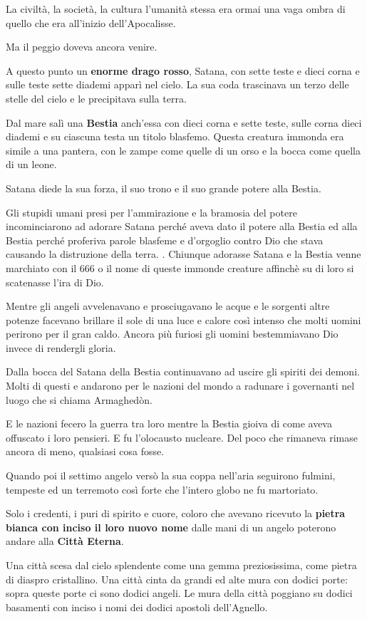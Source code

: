 \documentclass[12pt,a4paper,twoside,openany]{book}
\begin{document}
\begin{multicols}{2}
La civiltà, la società, la cultura l'umanità stessa era ormai una vaga ombra di quello che era all'inizio dell'Apocalisse.

Ma il peggio doveva ancora venire.

A questo punto un \textbf{enorme drago rosso}, Satana, con sette teste e dieci corna e sulle teste sette diademi apparì nel cielo. La sua coda trascinava un terzo delle stelle del cielo e le precipitava sulla terra. 

Dal mare salì una \textbf{Bestia} anch'essa con dieci corna e sette teste, sulle corna dieci diademi e su ciascuna testa un titolo blasfemo. Questa creatura immonda era simile a una pantera, con le zampe come quelle di un orso e la bocca come quella di un leone. 

Satana diede la sua forza, il suo trono e il suo grande potere alla Bestia. 

Gli stupidi umani presi per l'ammirazione e la bramosia del potere incominciarono ad adorare Satana perché aveva dato il potere alla Bestia ed alla Bestia perché proferiva parole blasfeme e d'orgoglio contro Dio che stava causando la distruzione della terra.
.
Chiunque adorasse Satana e la Bestia venne marchiato con il 666 o il nome di queste immonde creature affinchè su di loro si scatenasse l'ira di Dio.

Mentre gli angeli avvelenavano e prosciugavano le acque e le sorgenti altre potenze facevano brillare il sole di una luce e calore così intenso che molti uomini perirono per il gran caldo. Ancora più furiosi gli uomini bestemmiavano Dio invece di rendergli gloria.

Dalla bocca del Satana della Bestia continuavano ad uscire gli spiriti dei demoni. Molti di questi e andarono per le nazioni del mondo a radunare i governanti nel luogo che si chiama Armaghedòn.

E le nazioni fecero la guerra tra loro mentre la Bestia gioiva di come aveva offuscato i loro pensieri. E fu l'olocausto nucleare. Del poco che rimaneva rimase ancora di meno, qualsiasi cosa fosse.

Quando poi il settimo angelo versò la sua coppa nell’aria seguirono fulmini, tempeste ed un terremoto così forte che l'intero globo ne fu martoriato.

Solo i credenti, i puri di spirito e cuore, coloro che avevano ricevuto la \textbf{pietra bianca con inciso il loro nuovo nome} dalle mani di un angelo poterono andare alla \textbf{Città Eterna}.

Una città scesa dal cielo splendente come una gemma preziosissima, come pietra di diaspro cristallino. Una città cinta da grandi ed alte mura con dodici porte: sopra queste porte ci sono dodici angeli.
Le mura della città poggiano su dodici basamenti con inciso i nomi dei dodici apostoli dell’Agnello.



\end{multicols}
\end{document}
